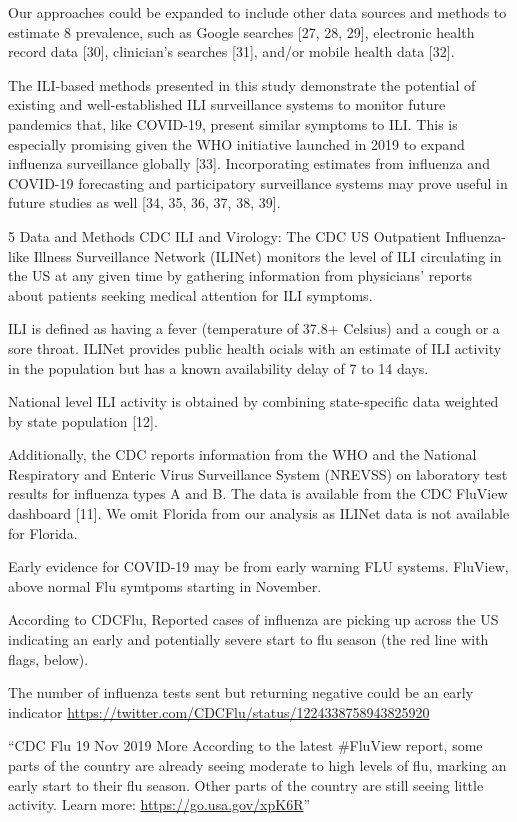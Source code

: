 \documentclass[
]{book}
\begin{document}
Our approaches could be expanded to include other data sources and methods to estimate
8
prevalence, such as Google searches {[}27, 28, 29{]}, electronic health record data {[}30{]}, clinician's
searches {[}31{]}, and/or mobile health data {[}32{]}.

The ILI-based methods presented
in this study demonstrate the potential of existing and well-established ILI surveillance systems to
monitor future pandemics that, like COVID-19, present similar symptoms to ILI. This is especially
promising given the WHO initiative launched in 2019 to expand influenza surveillance globally {[}33{]}.
Incorporating estimates from influenza and COVID-19 forecasting and participatory surveillance
systems may prove useful in future studies as well {[}34, 35, 36, 37, 38, 39{]}.

5 Data and Methods
CDC ILI and Virology: The CDC US Outpatient Influenza-like Illness Surveillance Network
(ILINet) monitors the level of ILI circulating in the US at any given time by gathering information
from physicians' reports about patients seeking medical attention for ILI symptoms.

ILI is defined as having a fever (temperature of 37.8+ Celsius) and a cough or a sore throat. ILINet provides public health ocials with an estimate of ILI activity in the population but has a known availability delay of 7 to 14 days.

National level ILI activity is obtained by combining state-specific data weighted by state population {[}12{]}.

Additionally, the CDC reports information from the WHO and the National Respiratory and Enteric Virus Surveillance System (NREVSS) on laboratory test results for influenza types A and B. The data is available from the CDC FluView dashboard {[}11{]}. We omit Florida from our analysis as ILINet data is not available for Florida.

Early evidence for COVID-19 may be from early warning FLU systems. FluView, above normal Flu symtpoms starting in November.

According to CDCFlu, Reported cases of influenza are picking up across the US indicating an early and potentially severe start to flu season (the red line with flags, below).

The number of influenza tests sent but returning negative could be an early indicator
\url{https://twitter.com/CDCFlu/status/1224338758943825920}

``CDC Flu
\citet{CDCFlu}
19 Nov 2019
More
According to the latest \#FluView report, some parts of the country are already seeing moderate to high levels of flu, marking an early start to their flu season. Other parts of the country are still seeing little activity. Learn more: \url{https://go.usa.gov/xpK6R}''
\end{document}
